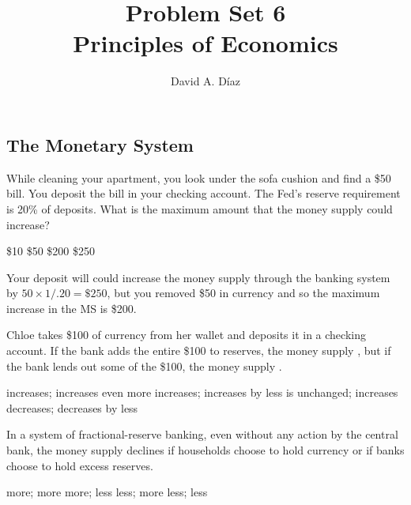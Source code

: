 \documentclass[addpoints,11pt]{exam}
\theoremstyle{definition}
\newcommand{\dd}[1]{}
\newcommand{\blank}[0]{\underline{\hspace{3cm}}}
\begin{document}
	
	

\title{\textbf{Problem Set 6 \dd{Answers and Selected Solutions}} \\ \vspace{2 mm} {\large Principles of Economics}}
\author{David A. D\'iaz}
\date{}
\maketitle

\subsection*{The Monetary System}

\begin{questions}	
	
	\question While cleaning your apartment, you look under the sofa cushion and find a \$50 bill. You deposit the bill in your checking account. The Fed's reserve requirement is 20\% of deposits. What is the maximum amount that the money supply could increase?
	
	\begin{choices}
		\choice \$10
		\choice \$50
		\CorrectChoice \$200
		\choice \$250
	\end{choices}
	
	\begin{solution}
		Your deposit will could increase the money supply through the banking system by $50 \times 1/.20 = \$250$, but you removed \$50 in currency and so the maximum increase in the MS is \$200.
	\end{solution}
	
	
	\question Chloe takes \$100 of currency from her wallet and deposits it in a checking account. If the bank adds the entire \$100 to reserves, the money supply \blank, but if the bank lends out some of the \$100, the money supply \blank.
	
	\begin{choices}
		\choice increases; increases even more
		\choice increases; increases by less
		\CorrectChoice is unchanged; increases
		\choice decreases; decreases by less
	\end{choices}
	
	
	
	\question In a system of fractional-reserve banking, even without any action by the central bank, the money supply declines if households choose to hold \blank currency or if banks choose to hold \blank excess reserves.
	
	\begin{choices}
		\CorrectChoice more; more
		\choice more; less
		\choice less; more
		\choice less; less
	\end{choices}
	

\end{questions}
\end{document}
